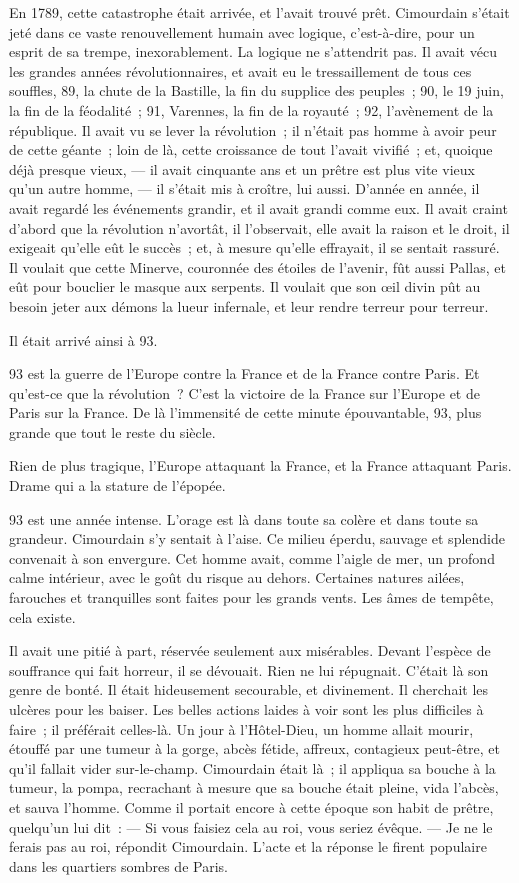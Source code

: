 \documentclass[french,twoside]{book} %
\begin{document}
En 1789, cette catastrophe était arrivée, et l’avait trouvé prêt. Cimourdain s’était jeté dans ce vaste renouvellement humain avec logique, c’est-à-dire, pour un esprit de sa trempe, inexorablement. La logique ne  s’attendrit pas. Il avait vécu les grandes années révolutionnaires, et avait eu le tressaillement de tous ces souffles, 89, la chute de la Bastille, la fin du supplice des peuples ; 90, le 19 juin, la fin de la féodalité ; 91, Varennes, la fin de la royauté ; 92, l’avènement de la république. Il avait vu se lever la révolution ; il n’était pas homme à avoir peur de cette géante ; loin de là, cette croissance de tout l’avait vivifié ; et, quoique déjà presque vieux, — il avait cinquante ans et un prêtre est plus vite vieux qu’un autre homme, — il s’était mis à croître, lui aussi. D’année en année, il avait regardé les événements grandir, et il avait grandi comme eux. Il avait craint d’abord que la révolution n’avortât, il l’observait, elle avait la raison et le droit, il exigeait qu’elle eût le succès ; et, à mesure qu’elle effrayait, il se sentait rassuré. Il voulait que cette Minerve, couronnée des étoiles de l’avenir, fût aussi Pallas, et eût pour bouclier le masque aux serpents. Il voulait que son œil divin pût au besoin jeter aux démons la lueur infernale, et leur rendre terreur pour terreur.\par
Il était arrivé ainsi à 93.\par
93 est la guerre de l’Europe contre la France et de la France contre Paris. Et qu’est-ce que la révolution ? C’est la victoire de la France sur l’Europe et de Paris sur la France. De là l’immensité de cette minute épouvantable, 93, plus grande que tout le reste du siècle.\par
Rien de plus tragique, l’Europe attaquant la France, et la France attaquant Paris. Drame qui a la stature de l’épopée.\par
93 est une année intense. L’orage est là dans toute  sa colère et dans toute sa grandeur. Cimourdain s’y sentait à l’aise. Ce milieu éperdu, sauvage et splendide convenait à son envergure. Cet homme avait, comme l’aigle de mer, un profond calme intérieur, avec le goût du risque au dehors. Certaines natures ailées, farouches et tranquilles sont faites pour les grands vents. Les âmes de tempête, cela existe.\par
Il avait une pitié à part, réservée seulement aux misérables. Devant l’espèce de souffrance qui fait horreur, il se dévouait. Rien ne lui répugnait. C’était là son genre de bonté. Il était hideusement secourable, et divinement. Il cherchait les ulcères pour les baiser. Les belles actions laides à voir sont les plus difficiles à faire ; il préférait celles-là. Un jour à l’Hôtel-Dieu, un homme allait mourir, étouffé par une tumeur à la gorge, abcès fétide, affreux, contagieux peut-être, et qu’il fallait vider sur-le-champ. Cimourdain était là ; il appliqua sa bouche à la tumeur, la pompa, recrachant à mesure que sa bouche était pleine, vida l’abcès, et sauva l’homme. Comme il portait encore à cette époque son habit de prêtre, quelqu’un lui dit : — Si vous faisiez cela au roi, vous seriez évêque. — Je ne le ferais pas au roi, répondit Cimourdain. L’acte et la réponse le firent populaire dans les quartiers sombres de Paris.\par
\end{document}
